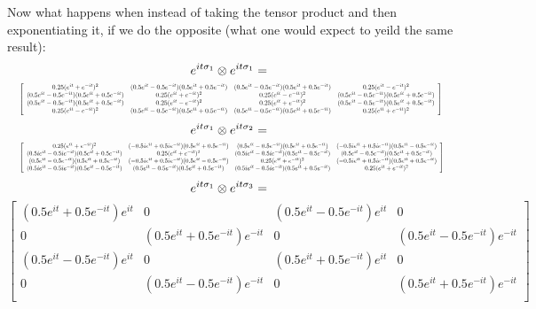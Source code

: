 \documentclass{article}
\begin{document}
Now what happens when instead of taking the tensor product and then exponentiating it, if we do the opposite (what one would expect to yeild the same result):
\[ e^{it\sigma_1} \otimes e^{it\sigma_1} = \\ \] \[ \resizebox{\textwidth}{!} { $\left[
    \begin{array}{cccc}
    0.25(e^{it} + e^{-it})^2 & ({0.5e^{it} - 0.5e^{-it}})({0.5e^{it} + 0.5e^{-it}}) & ({0.5e^{it} - 0.5e^{-it}})({0.5e^{it} + 0.5e^{-it}}) & 0.25(e^{it} - e^{-it})^2 \\
    ({0.5e^{it} - 0.5e^{-it}})({0.5e^{it} + 0.5e^{-it}}) & 0.25(e^{it} + e^{-it})^2 & 0.25(e^{it} - e^{-it})^2 & ({0.5e^{it} - 0.5e^{-it}})({0.5e^{it} + 0.5e^{-it}}) \\
    ({0.5e^{it} - 0.5e^{-it}})({0.5e^{it} + 0.5e^{-it}}) & 0.25(e^{it} - e^{-it})^2 & 0.25(e^{it} + e^{-it})^2 & ({0.5e^{it} - 0.5e^{-it}})({0.5e^{it} + 0.5e^{-it}}) \\
    0.25(e^{it} - e^{-it})^2 & ({0.5e^{it} - 0.5e^{-it}})({0.5e^{it} + 0.5e^{-it}}) & ({0.5e^{it} - 0.5e^{-it}})({0.5e^{it} + 0.5e^{-it}}) & 0.25(e^{it} + e^{-it})^2 \\
    \end{array}
    \right] $ } \]
\[ e^{it\sigma_1} \otimes e^{it\sigma_2} = \\ \] \[ \resizebox{\textwidth}{!} { $\left[
    \begin{array}{cccc}
    0.25(e^{it} + e^{-it})^2 & ({-0.5ie^{it} + 0.5ie^{-it}})({0.5e^{it} + 0.5e^{-it}}) & ({0.5e^{it} - 0.5e^{-it}})({0.5e^{it} + 0.5e^{-it}}) & ({-0.5ie^{it} + 0.5ie^{-it}})({0.5e^{it} - 0.5e^{-it}}) \\
    ({0.5ie^{it} - 0.5ie^{-it}})({0.5e^{it} + 0.5e^{-it}}) & 0.25(e^{it} + e^{-it})^2 & ({0.5ie^{it} - 0.5ie^{-it}})({0.5e^{it} - 0.5e^{-it}}) & ({0.5e^{it} - 0.5e^{-it}})({0.5e^{it} + 0.5e^{-it}}) \\
    ({0.5e^{it} - 0.5e^{-it}})({0.5e^{it} + 0.5e^{-it}}) & ({-0.5ie^{it} + 0.5ie^{-it}})({0.5e^{it} - 0.5e^{-it}}) & 0.25(e^{it} + e^{-it})^2 & ({-0.5ie^{it} + 0.5ie^{-it}})({0.5e^{it} + 0.5e^{-it}}) \\
    ({0.5ie^{it} - 0.5ie^{-it}})({0.5e^{it} - 0.5e^{-it}}) & ({0.5e^{it} - 0.5e^{-it}})({0.5e^{it} + 0.5e^{-it}}) & ({0.5ie^{it} - 0.5ie^{-it}})({0.5e^{it} + 0.5e^{-it}}) & 0.25(e^{it} + e^{-it})^2 \\
    \end{array}
    \right] $}\]
\[ e^{it\sigma_1} \otimes e^{it\sigma_3} = \\ \] \[\left[
    \begin{array}{cccc}
    ({0.5e^{it} + 0.5e^{-it}})e^{it} & 0 & ({0.5e^{it} - 0.5e^{-it}})e^{it} & 0 \\
    0 & ({0.5e^{it} + 0.5e^{-it}})e^{-it} & 0 & ({0.5e^{it} - 0.5e^{-it}})e^{-it} \\
    ({0.5e^{it} - 0.5e^{-it}})e^{it} & 0 & ({0.5e^{it} + 0.5e^{-it}})e^{it} & 0 \\
    0 & ({0.5e^{it} - 0.5e^{-it}})e^{-it} & 0 & ({0.5e^{it} + 0.5e^{-it}})e^{-it} \\
    \end{array}
    \right] \]
\end{document}
